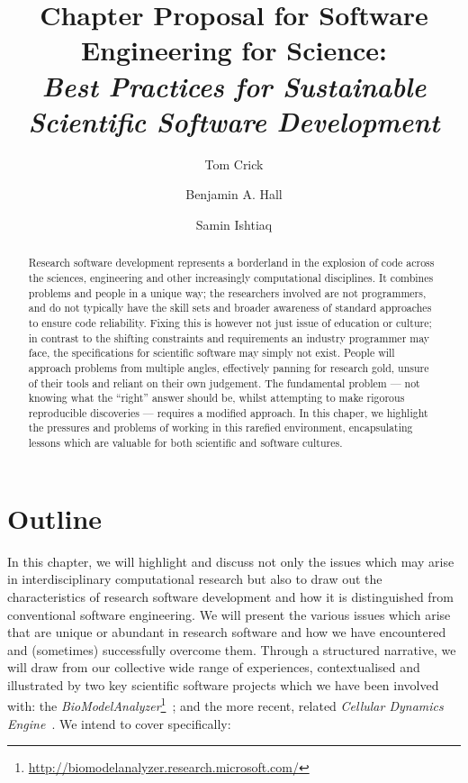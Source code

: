 \documentclass[a4paper,11pt]{article}
\title{Chapter Proposal for Software Engineering for Science:\\
  \emph{Best Practices for Sustainable Scientific Software Development}}
\author[1]{Tom Crick}
\author[2]{Benjamin A. Hall}
\author[3]{Samin Ishtiaq}
\affil[1]{Department of Computing \& Information Systems, Cardiff
  Metropolitan University, UK}
\affil[2]{MRC Cancer Unit, University of Cambridge, UK}
\affil[3]{Microsoft Research Cambridge, UK}
\affil[1]{\protect\url{tcrick@cardiffmet.ac.uk}}
\affil[2]{\protect\url{bh418@mrc-cu.cam.ac.uk}}
\affil[3]{\protect\url{samin.ishtiaq@microsoft.com}}
\date{ }
\begin{document}
\maketitle

\vspace{-1cm}
\begin{abstract}
Research software development represents a borderland in the explosion
of code across the sciences, engineering and other increasingly
computational disciplines. It combines problems and people in a unique
way; the researchers involved are not programmers, and do not
typically have the skill sets and broader awareness of standard
approaches to ensure code reliability.  Fixing this is however not
just issue of education or culture; in contrast to the shifting
constraints and requirements an industry programmer may face, the
specifications for scientific software may simply not exist. People
will approach problems from multiple angles, effectively panning for
research gold, unsure of their tools and reliant on their own
judgement.  The fundamental problem --- not knowing what the ``right''
answer should be, whilst attempting to make rigorous reproducible
discoveries --- requires a modified approach. In this chaper, we
highlight the pressures and problems of working in this rarefied
environment, encapsulating lessons which are valuable for both
scientific and software cultures.
\end{abstract}

\section*{Outline}

In this chapter, we will highlight and discuss not only the issues
which may arise in interdisciplinary computational research but also
to draw out the characteristics of research software development and
how it is distinguished from conventional software engineering. We
will present the various issues which arise that are unique or
abundant in research software and how we have encountered and
(sometimes) successfully overcome them. Through a structured
narrative, we will draw from our collective wide range of experiences,
contextualised and illustrated by two key scientific software projects
which we have been involved with: the
{\emph{BioModelAnalyzer}}\footnote{\url{http://biomodelanalyzer.research.microsoft.com/}}~\cite{benque-et-al:2012};
and the more recent, related {\emph{Cellular Dynamics
Engine}}~\cite{hall-et-al:2015}. We intend to cover specifically:\\
\end{document}
